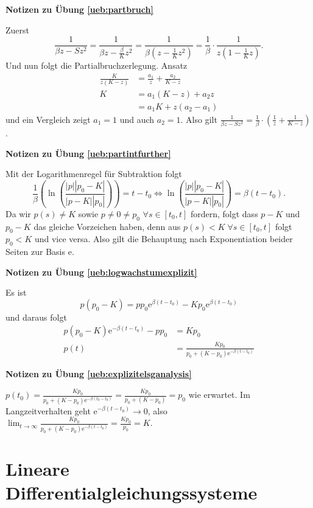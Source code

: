 \documentclass[%
11pt,%
twoside,%
titlepage,%
swissgerman,%
headsepline%
]{scrartcl}
\newcommand{\faReturnGray}{\textcolor{gray}{\faMailReply}} %
\theoremstyle{definition}
\theoremstyle{plain}
\newcommand{\concatueb}[1]{ueb:#1}%
\newcommand{\concatlsg}[1]{lsg:#1}%
\newenvironment{lsg}[1]{%
    \par\noindent\textbf{Notizen zu Übung \ref{\concatueb{#1}}}\label{\concatlsg{#1}}
    \hfill\hyperref[\concatueb{#1}]{\faReturnGray}\par %
}{%
    \par%
}
\begin{document}
\begin{lsg}{partbruch}
    Zuerst
    $$\frac{1}{\beta z-Sz^2}=\frac{1}{\beta z-\frac{\beta}{K}z^2}=\frac{1}{\beta(z-\frac{1}{K}z^2)}=\frac{1}{\beta}\cdot\frac{1}{z(1-\frac{1}{K}z)}.$$
    Und nun folgt die Partialbruchzerlegung. Ansatz
    \begin{align*}
        \frac{K}{z(K-z)} &= \frac{a_1}{z}+\frac{a_2}{K-z}\\
        K &= a_1(K-z)+a_2z\\
        &= a_1K+z(a_2-a_1)
    \end{align*}
    und ein Vergleich zeigt $a_1=1$ und auch $a_2=1$. Also gilt $\frac{1}{\beta  z-Sz^2}=\frac{1}{\beta }\cdot\left(\frac{1}{z}+\frac{1}{K-z}\right)$.
\end{lsg}
\begin{lsg}{partintfurther}
    Mit der Logarithmenregel für Subtraktion folgt
    $$\frac{1}{\beta}\left(\ln\left(\frac{|p||p_0-K|}{|p-K||p_0|}\right)\right)=t-t_0\Leftrightarrow \ln\left(\frac{|p||p_0-K|}{|p-K||p_0|}\right)=\beta(t-t_0).$$
    Da wir $p(s)\neq K$ sowie $p\neq0\neq p_0$ $\forall s\in[t_0,t]$ fordern, folgt dass $p-K$ und $p_0-K$ das gleiche Vorzeichen haben, denn aus $p(s)<K\;\forall s\in[t_0,t]$ folgt $p_0<K$ und vice versa. Also gilt die Behauptung nach Exponentiation beider Seiten zur Basis $\mathrm{e}$.
\end{lsg}
\begin{lsg}{logwachstumexplizit}
    Es ist
    $$p(p_0-K)=pp_0\mathrm{e}^{\beta(t-t_0)}-Kp_0\mathrm{e}^{\beta(t-t_0)}$$
    und daraus folgt
    \begin{align*}
        p(p_0-K)\mathrm{e}^{-\beta(t-t_0)}-pp_0 &= Kp_0\\
        p(t) &= \frac{Kp_0}{p_0+(K-p_0)\mathrm{e}^{-\beta(t-t_0)}}
    \end{align*}
\end{lsg}
\begin{lsg}{explizitelsganalysis}
    $p(t_0)=\frac{Kp_0}{p_0+(K-p_0)\mathrm{e}^{-\beta(t_0-t_0)}}=\frac{Kp_0}{p_0+(K-p_0)}=p_0$ wie erwartet. Im Langzeitverhalten geht $\mathrm{e}^{-\beta(t-t_0)}\to0$, also $\lim_{t\to\infty}\frac{Kp_0}{p_0+(K-p_0)\mathrm{e}^{-\beta(t-t_0)}}=\frac{Kp_0}{p_0}=K$.
\end{lsg}

\clearpage

\section{Lineare Differentialgleichungssysteme}
\end{document}
